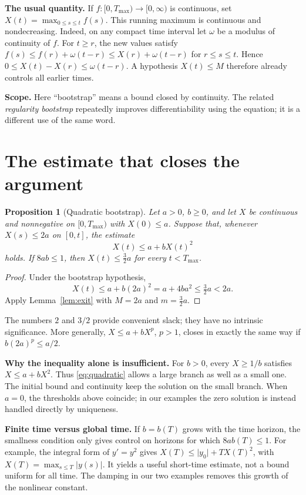 \documentclass[a4paper,10pt]{article}
\numberwithin{equation}{section}
\newtheorem{proposition}[theorem]{Proposition}
\theoremstyle{definition}
\theoremstyle{remark}
\newcommand{\abs}[1]{\lvert#1\rvert}
\newcommand{\Tmax}{T_{\max}}
\newcommand{\pageheading}[1]{\section{#1}}
\begin{document}
\textbf{The usual quantity.} If $f:[0,\Tmax)\to[0,\infty)$ is continuous, set
$X(t)=\max_{0\leq s\leq t}f(s)$. This running maximum is continuous and
nondecreasing. Indeed, on any compact time interval let $\omega$ be a modulus
of continuity of $f$. For $t\geq r$, the new values satisfy
$f(s)\leq f(r)+\omega(t-r)\leq X(r)+\omega(t-r)$ for $r\leq s\leq t$.
Hence $0\leq X(t)-X(r)\leq\omega(t-r)$. A hypothesis $X(t)\leq M$ therefore
already controls all earlier times.

\textbf{Scope.} Here ``bootstrap'' means a bound closed by continuity. The related
\emph{regularity bootstrap} repeatedly improves differentiability using the
equation; it is a different use of the same word.

\newpage
\pageheading{The estimate that closes the argument}
\begin{proposition}[Quadratic bootstrap]\label{prop:quadratic}
Let $a>0$, $b\geq0$, and let $X$ be continuous and nonnegative on
$[0,\Tmax)$ with $X(0)\leq a$. Suppose that, whenever $X(s)\leq2a$ on
$[0,t]$, the estimate
\begin{equation}\label{eq:quadratic}
X(t)\leq a+bX(t)^2
\end{equation}
holds. If $8ab\leq1$, then $X(t)\leq\frac32a$ for every $t<\Tmax$.
\end{proposition}
\begin{proof}
Under the bootstrap hypothesis,
\[
X(t)\leq a+b(2a)^2=a+4ba^2\leq\tfrac32a<2a.
\]
Apply Lemma~\ref{lem:exit} with $M=2a$ and $m=\frac32a$.
\end{proof}
The numbers $2$ and $3/2$ provide convenient slack; they have no intrinsic
significance. More generally, $X\leq a+bX^p$, $p>1$, closes in exactly the
same way if $b(2a)^p\leq a/2$.

\textbf{Why the inequality alone is insufficient.}
For $b>0$, every $X\geq1/b$ satisfies $X\leq a+bX^2$. Thus
\eqref{eq:quadratic} allows a large branch as well as a small one. The initial
bound and continuity keep the solution on the small branch. When $a=0$,
the thresholds above coincide; in our examples the zero solution is instead
handled directly by uniqueness.

\textbf{Finite time versus global time.}
If $b=b(T)$ grows with the time horizon, the smallness condition only gives
control on horizons for which $8ab(T)\leq1$. For example, the integral form
of $y'=y^2$ gives $X(T)\leq\abs{y_0}+T X(T)^2$, with
$X(T)=\max_{s\leq T}\abs{y(s)}$. It yields a useful short-time estimate,
not a bound uniform for all time. The damping in our two examples removes
this growth of the nonlinear constant.
\end{document}
